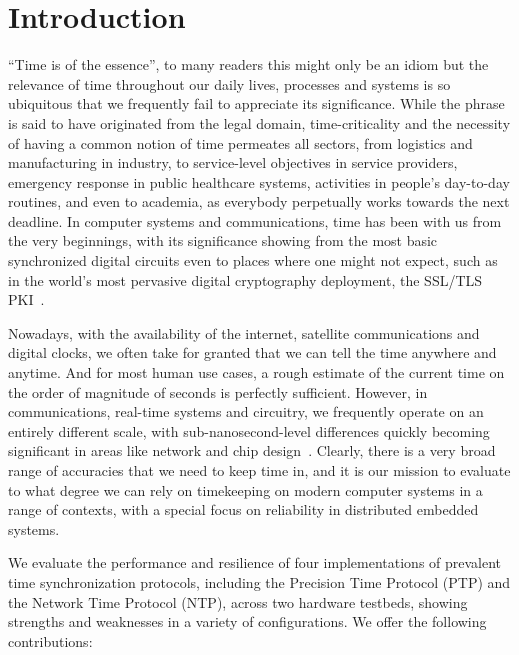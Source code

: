 
\section{Introduction}
``Time is of the essence'', to many readers this might only be an idiom but the relevance of time throughout our daily lives, processes and systems is so ubiquitous that we frequently fail to appreciate its significance. While the phrase is said to have originated from the legal domain, time-criticality and the necessity of having a common notion of time permeates all sectors, from logistics and manufacturing in industry, to service-level objectives in service providers, emergency response in public healthcare systems, activities in people's day-to-day routines, and even to academia, as everybody perpetually works towards the next deadline. In computer systems and communications, time has been with us from the very beginnings, with its significance showing from the most basic synchronized digital circuits even to places where one might not expect, such as in the world's most pervasive digital cryptography deployment, the SSL/TLS PKI~\cite{ssl-client-warnings}.

Nowadays, with the availability of the internet, satellite communications and digital clocks, we often take for granted that we can tell the time anywhere and anytime. And for most human use cases, a rough estimate of the current time on the order of magnitude of seconds is perfectly sufficient.
However, in communications, real-time systems and circuitry, we frequently operate on an entirely different scale, with sub-nanosecond-level differences quickly becoming significant in areas like network and chip design~\cite{nanopu,sub-nanosecond-comms-design}. Clearly, there is a very broad range of accuracies that we need to keep time in, and it is our mission to evaluate to what degree we can rely on timekeeping on modern computer systems in a range of contexts, with a special focus on reliability in distributed embedded systems.

We evaluate the performance and resilience of four implementations of prevalent time synchronization protocols, including the Precision Time Protocol (PTP) and the Network Time Protocol (NTP), across two hardware testbeds, showing strengths and weaknesses in a variety of configurations. We offer the following contributions:

